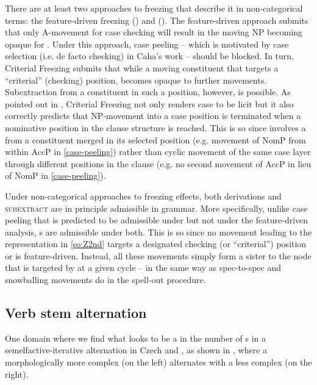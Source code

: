 \noindent
There are at least two approaches to freezing that describe it in non-categorical terms: the feature-driven freezing (\citealt{Bux2008,Lohndal2011}) and  (\citealt{Rizzi2006,Rizzi2007,RizziShlonsky2007}). The feature-driven approach submits that only A-movement for case checking will result in the moving NP becoming opaque for . Under this approach, case peeling -- which is motivated by case selection (i.e. de facto checking) in Caha's work -- should be blocked. In turn, Criterial Freezing submits that while a moving constituent that targets a ``criterial'' (checking) position, becomes opaque to further movements. Subextraction from a constituent in such a position, however, is possible. As pointed out in \citeauthor{Caha2009} \citeyearpar[146--147]{Caha2009}, Criterial Freezing not only renders case  to be licit but it also correctly predicts that NP-movement into a case position is terminated when a nominative position in the clause structure is reached. This is so since  involves a  from a  constituent merged in its selected position (e.g. movement of NomP from within AccP in \ref{case-peeling}) rather than cyclic movement of the same case layer through different positions in the clause (e.g. no second movement of AccP in lieu of NomP in \ref{case-peeling}). 
\par
Under non-categorical approaches to freezing effects, both  derivations and \textsc{subextract} are in principle admissible in grammar.  More specifically, unlike case peeling that is predicted to be admissible under  but not under the feature-driven analysis, s are admissible under both. This is so since no movement leading to the representation in \ref{so:Z2nd} targets a designated checking (or ``criterial'') position or is feature-driven. Instead, all these movements simply form a sister to the node that is targeted by  at a given cycle -- in the same way as spec-to-spec and snowballing movements do in the spell-out procedure.

\subsection{Verb stem alternation}

One domain where we find what looks to be a  in the number of s in a semelfactive-iterative alternation  in Czech and , as shown in \Next, where a morphologically more complex  (on the left) alternates with a less complex  (on the right).

